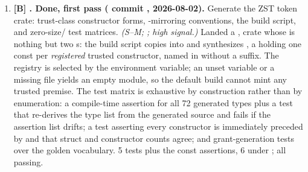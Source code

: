 \begin{enumerate}[leftmargin=2.2em, itemsep=0.35em]
\item \textbf{[B] . \textbf{Done, first pass}
  ( commit , 2026-08-02).} Generate the
  ZST token crate:
  trust-class constructor forms, -mirroring conventions, the
   build script, and zero-size/ test
  matrices.
  \emph{(S--M; ; high signal.)}
  Landed a ,  crate whose
   is nothing but two s: the build script
  copies  into
   and synthesizes , a
   holding one  const per
  \emph{registered} trusted constructor, named in
   without a suffix. The registry is
  selected by the  environment variable;
  an unset variable or a missing file yields an empty module, so the
  default build cannot mint any trusted premise. The test matrix is
  exhaustive by construction rather than by enumeration: a compile-time
   assertion for all 72 generated types plus a test
  that re-derives the type list from the generated source and fails if
  the assertion list drifts; a test asserting every constructor is
  immediately preceded by  and that struct and
  constructor counts agree; and grant-generation tests over the golden
  vocabulary. 5 tests plus the const assertions, 6 under
  ; all passing.


\end{enumerate}
